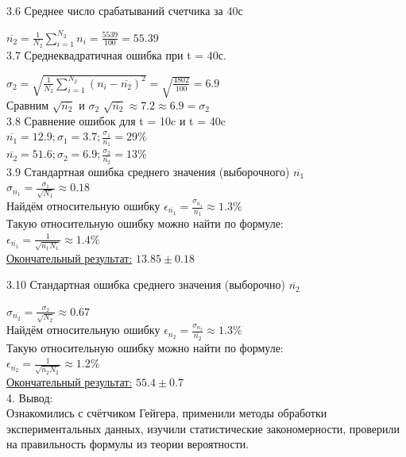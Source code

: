 \documentclass[12pt, a4paper]{article}
\begin{document}
          {\large 3.6 Среднее число срабатываний счетчика за 40с \\}
          
          $\overline{n_2} = \frac{1}{N_2} \sum_{i = 1}^{N_2} n_i = \frac{5539}{100} = 55.39 $ \\

          {\large 3.7 Среднеквадратичная ошибка при t = 40с. \\}

          $\sigma_2 = \sqrt{\frac{1}{N_2} \sum_{i = 1}^{N_2} (n_i - \overline{n_2})^2} = \sqrt{\frac{4802}{100}} = 6.9$ \\
          Сравним $\sqrt{\overline{n_2}}$ и $\sigma_2$
          $\sqrt{\overline{n_2}} \approx 7.2 \approx 6.9 = \sigma_2$ \\
          
          {\large 3.8 Сравнение ошибок для t = 10c и t = 40c \\}
          $\overline{n_1} = 12.9; \sigma_1 = 3.7; \frac{\sigma_1}{\overline{n_1}} = 29\% $ \\
          $\overline{n_2} = 51.6; \sigma_2 = 6.9; \frac{\sigma_2}{\overline{n_2}} = 13\% $ \\
          
          {\large 3.9 Стандартная ошибка среднего значения (выборочного) $\overline{{n_1}}$ \\}
          $\sigma_{\overline{n_1}} = \frac{\sigma_1}{\sqrt{N_1}} \approx 0.18 $ \\
          Найдём относительную ошибку $\epsilon_{\overline{n_1}} = \frac{\sigma_{\overline{n_1}}}{\overline{n_1}} \approx 1.3 \%$ \\
          Такую относительную ошибку можно найти по формуле: \\
          $\epsilon_{\overline{n_1}} = \frac{1}{\sqrt{\overline{n_1} N_1}} \approx 1.4\%$ \\
            \underline{Окончательный результат:} $13.85 \pm 0.18$ 
            \vspace*{0.3cm}

          {\large 3.10 Стандартная ошибка среднего значения (выборочно) $\overline{{n_2}}$ \\}

          $\sigma_{\overline{n_2}} = \frac{\sigma_2}{\sqrt{N_2}} \approx 0.67 $ \\
          Найдём относительную ошибку $\epsilon_{\overline{n_2}} = \frac{\sigma_{\overline{n_2}}}{\overline{n_2}} \approx 1.3 \%$ \\
          Такую относительную ошибку можно найти по формуле: \\
          $\epsilon_{\overline{n_2}} = \frac{1}{\sqrt{\overline{n_2} N_2}} \approx 1.2\%$ \\
            \underline{Окончательный результат:} $55.4 \pm 0.7$ \\ 

          {\Large 4. Вывод: \\}
          Ознакомились с счётчиком Гейгера, применили методы обработки экспериментальных данных, изучили статистические закономерности, проверили на правильность формулы из теории вероятности.
        
\end{document}
